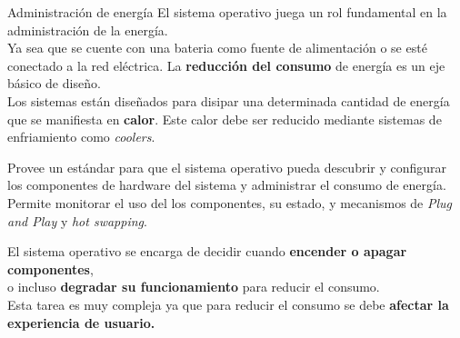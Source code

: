 \documentclass[aspectratio=169]{beamer}
\begin{document}
\begin{frame}{Administración de energía}
    \small
    El sistema operativo juega un rol fundamental en la administración de la energía.\\
    \medskip
    Ya sea que se cuente con una bateria como fuente de alimentación o se esté conectado a la red eléctrica.
    \textcolor{naranjauca}{La \textbf{reducción del consumo} de energía es un eje básico de diseño.}\\
    \medskip
    \textcolor{verdeuca}{Los sistemas están diseñados para disipar una determinada cantidad de energía que se manifiesta en \textbf{calor}.
    Este calor debe ser reducido mediante sistemas de enfriamiento como \emph{coolers}.}
    \medskip
    \begin{tcolorbox}[size=small,width=\textwidth,colback={gray!30},title={\emph{Advanced Configuration and Power Interface} (\texttt{ACPI})}]
    \small
    Provee un estándar para que el sistema operativo pueda descubrir y configurar los componentes de hardware del sistema y administrar el consumo de energía.
    Permite monitorar el uso del los componentes, su estado, y mecanismos de \emph{Plug and Play} y \emph{hot swapping}.
    \end{tcolorbox}
    \medskip
    \textcolor{verdeuca}{El sistema operativo se encarga de decidir cuando \textbf{encender o apagar componentes},\\
    o incluso \textbf{degradar su funcionamiento} para reducir el consumo.}\\
    \medskip
    \textcolor{naranjauca}{Esta tarea es muy compleja ya que para reducir el consumo se debe \textbf{afectar la experiencia de usuario.}}
\end{frame}
\end{document}
